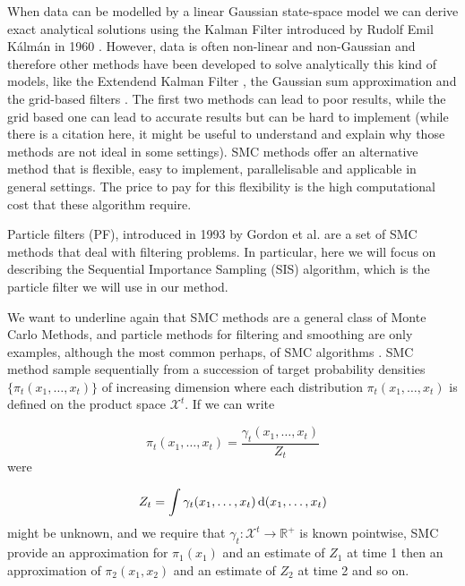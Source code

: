 When data can be modelled by a linear Gaussian state-space model we can derive exact analytical solutions using the Kalman Filter introduced by Rudolf Emil K\'alm\'an in 1960 \cite{Kalman}. However, data is often non-linear and non-Gaussian and therefore other methods have been developed to solve analytically this kind of models, like the Extendend Kalman Filter \cite{Anderson} \cite{Jazwinski}, the Gaussian sum approximation \cite{Soreson} and the grid-based filters \cite{Bucy}. The first two methods can lead to poor results, while the grid based one can lead to accurate results but can be hard to implement (while there is a citation here, it might be useful to understand and explain why those methods are not ideal in some settings). SMC methods offer an alternative method that is flexible, easy to implement, parallelisable and applicable in general settings\cite{DoucetBook}. The price to pay for this flexibility is the high computational cost that these algorithm require.

Particle filters (PF), introduced in 1993 by Gordon et al. \cite{Gordon} are a set of SMC methods that deal with filtering problems. In particular, here we will focus on describing the Sequential Importance Sampling (SIS) algorithm, which is the particle filter we will use in our method.

We want to underline again that SMC methods are a general class of Monte Carlo Methods, and particle methods for filtering and smoothing are only examples, although the most common perhaps, of SMC algorithms \cite{DoucetTutorial}. SMC method sample sequentially from a succession of target probability densities $\{ \pi_t(x_1, \dots, x_t) \}$ of increasing dimension where each distribution $\pi_t(x_1, \dots, x_t)$ is defined on the product space $\mathcal{X}^t$. If we can write

\begin{equation} \label{eq:pi1}
    \pi_t(x_1, \dots, x_t) = \frac{\gamma_t(x_1, \dots, x_t)}{Z_t}
\end{equation}
were

\begin{equation} \label{eq:Z1}
    Z_t = \int \gamma_t(x_1, \dots, x_t) \operatorname{d}\!{(}x_1, \dots, x_t)
\end{equation}
might be unknown, and we require that $\gamma_t : \mathcal{X}^t \rightarrow \mathbb{R}^+$ is known pointwise, SMC provide an approximation for $\pi_1(x_1)$ and an estimate of $Z_1$ at time 1 then an approximation of $\pi_2(x_1, x_2)$ and an estimate of $Z_2$ at time 2 and so on.

